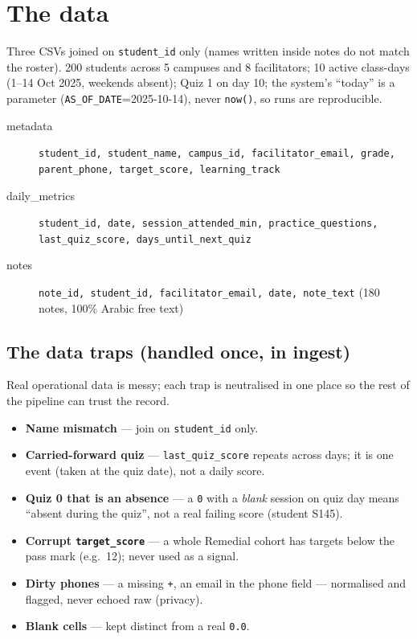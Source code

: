 \documentclass[11pt,paper=a4,parskip=half,DIV=11]{scrartcl}
\begin{document}
\section{The data}
Three CSVs joined on \texttt{student\_id} only (names written inside notes do not match the roster).
200 students across 5 campuses and 8 facilitators; 10 active class-days (1--14 Oct 2025, weekends
absent); Quiz 1 on day 10; the system's ``today'' is a parameter (\texttt{AS\_OF\_DATE}=2025-10-14),
never \texttt{now()}, so runs are reproducible.

\begin{description}
\item[metadata] \texttt{student\_id, student\_name, campus\_id, facilitator\_email, grade, parent\_phone, target\_score, learning\_track}
\item[daily\_metrics] \texttt{student\_id, date, session\_attended\_min, practice\_questions, last\_quiz\_score, days\_until\_next\_quiz}
\item[notes] \texttt{note\_id, student\_id, facilitator\_email, date, note\_text} (180 notes, 100\% Arabic free text)
\end{description}

\subsection{The data traps (handled once, in ingest)}
Real operational data is messy; each trap is neutralised in one place so the rest of the pipeline can
trust the record.
\begin{itemize}
\item \textbf{Name mismatch} --- join on \texttt{student\_id} only.
\item \textbf{Carried-forward quiz} --- \texttt{last\_quiz\_score} repeats across days; it is one event
(taken at the quiz date), not a daily score.
\item \textbf{Quiz 0 that is an absence} --- a \texttt{0} with a \emph{blank} session on quiz day means
``absent during the quiz'', not a real failing score (student S145).
\item \textbf{Corrupt \texttt{target\_score}} --- a whole Remedial cohort has targets below the pass mark
(e.g.\ 12); never used as a signal.
\item \textbf{Dirty phones} --- a missing \texttt{+}, an email in the phone field --- normalised and flagged,
never echoed raw (privacy).
\item \textbf{Blank cells} --- kept distinct from a real \texttt{0.0}.
\end{itemize}
\end{document}
